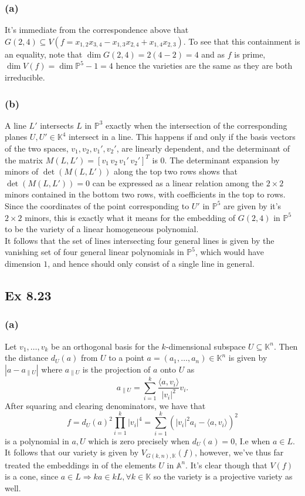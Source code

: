 \documentclass{article}
\theoremstyle{definition}
\newcommand{\K}{\mathbb{K}}
\renewcommand{\P}{\mathbb{P}}
\newcommand{\A}{\mathbb{A}}
\newcommand{\PP}[1]{\P^{#1}}
\begin{document}
\subsubsection*{(a)}

It's immediate from the correspondence above that $G(2, 4) \subseteq V(f =
x_{1, 2}x_{3, 4} - x_{1, 3}x_{2, 4} + x_{1, 4}x_{2, 3})$. To see that this
containment is an equality, note that $\dim G(2, 4) = 2(4 - 2) = 4$ and as $f$
is prime, $\dim V(f) = \dim \PP{5} - 1 = 4$ hence the varieties are the same as
they are both irreducible.

\subsubsection*{(b)}

A line $L'$ intersects $L$ in $\PP{3}$ exactly when the intersection of the
corresponding planes $U, U' \in \K^4$ intersect in a line. This happens if and
only if the basis vectors of the two spaces, $v_1, v_2, v_1', v_2'$, are
linearly dependent, and the determinant of the matrix $M(L, L') = \left[v_1\, v_2\,
v_1'\, v_2'\right]^T$ is $0$. The determinant expansion by minors of $\det(M(L, L'))$
along the top two rows shows that $\det(M(L, L')) = 0$ can be expressed as a
linear relation among the $2 \times 2$ minors contained in the bottom two rows,
with coefficients in the top to rows. Since the coordinates of the point
corresponding to $U'$ in $\PP{5}$ are given by it's $2 \times 2$ minors, this
is exactly what it means for the embedding of $G(2, 4)$ in $\PP{5}$ to be the
variety of a linear homogeneous polynomial. \\

It follows that the set of lines intersecting four general lines is given by
the vanishing set of four general linear polynomials in $\PP{5}$, which would
have dimension $1$, and hence should only consist of a single line in general.


\subsection*{Ex 8.23}
\subsubsection*{(a)}

Let $v_1, \ldots, v_k$ be an orthogonal basis for the $k$-dimensional subspace
$U \subseteq \K^{n}$. Then the distance $d_U(a)$ from $U$ to a point $a = (a_1,
\ldots, a_n) \in \K^n$ is given by $|a - a_{\|U}|$ where $a_{\|U}$ is the
projection of $a$ onto $U$ as
\[
	a_{\|U} = \sum_{i = 1}^{k} \frac{\langle a, v_i \rangle}{|v_i|^2}v_i.
\] 
After squaring and clearing denominators, we have that
\[
	f 
	=
	d_U(a)^2
	\prod_{i = 1}^{k} |v_i|^{4}
	=
	\sum_{i = 1}^{k} 
	(|v_i|^{2}a_i - \langle a, v_i \rangle)^{2}
\] 
is a polynomial in $a, U$ which is zero precisely when $d_U(a) = 0$, I.e when
$a \in L$. It follows that our variety is given by $V_{G(k, n), \K}(f)$,
however, we've thus far treated the embeddings in of the elements $U$ in
$\A^{n}$. It's clear though that $V(f)$ is a cone, since $a \in L \Rightarrow
ka \in kL, \forall k \in \K$ so the variety is a projective variety as well.
\end{document}

